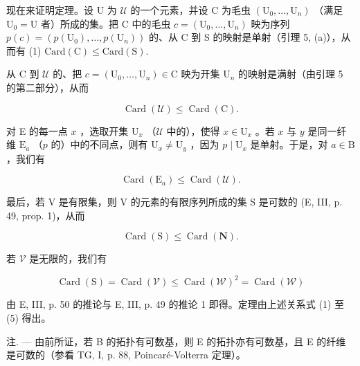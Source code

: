 现在来证明定理。设 U 为 \(\mathcal{U}\) 的一个元素，并设 C 为毛虫 \((\mathrm{U}_0,\dots ,\mathrm{U}_n)\) （满足 \(\mathrm{U}_0 = \mathrm{U}\) 者）所成的集。把 C 中的毛虫 \(c = (\mathrm{U}_0,\dots ,\mathrm{U}_n)\) 映为序列 \(p(c) = (p(\mathrm{U}_{0}), \ldots, p(\mathrm{U}_{n}))\) 的、从 C 到 S 的映射是单射（引理 5, (a)），从而有 (1) \(\text{Card}(\mathrm{C}) \leqslant \text{Card}(\mathrm{S}).\)

从 C 到 \(\mathcal{U}\) 的、把 \(c = (\mathrm{U}_0,\dots ,\mathrm{U}_n)\in \mathrm{C}\) 映为开集 \(\mathrm{U}_n\) 的映射是满射（由引理 5 的第二部分），从而

\[
\operatorname{Card} (\mathcal {U}) \leqslant \operatorname{Card} (\mathrm{C}).\tag{2}
\]

对 E 的每一点 \(x\) ，选取开集 \(\mathrm{U}_x\) （\(\mathcal{U}\) 中的），使得 \(x \in \mathrm{U}_x\) 。若 \(x\) 与 \(y\) 是同一纤维 \(\mathrm{E}_a\) （\(p\) 的）中的不同点，则有 \(\mathrm{U}_x \neq \mathrm{U}_y\) ，因为 \(p \mid \mathrm{U}_x\) 是单射。于是，对 \(a \in \mathrm{B}\) ，我们有

\[
\operatorname{Card} \left(\mathrm{E} _ {a}\right) \leqslant \operatorname{Card} (\mathcal {U}).\tag{3}
\]

最后，若 V 是有限集，则 V 的元素的有限序列所成的集 S 是可数的 (E, III, p. 49, prop. 1)，从而

\[
\operatorname{Card} (\mathrm{S}) \leqslant \operatorname{Card} (\mathbf {N}).\tag{4}
\]

若 \(\mathcal{V}\) 是无限的，我们有

\[
\operatorname{Card} (\mathrm{S}) = \operatorname{Card} (\mathcal {V}) \leqslant \operatorname{Card} (\mathcal {W}) ^ {2} = \operatorname{Card} (\mathcal {W})\tag{5}
\]

由 E, III, p. 50 的推论与 E, III, p. 49 的推论 1 即得。定理由上述关系式 (1) 至 (5) 得出。

注. --- 由前所证，若 B 的拓扑有可数基，则 E 的拓扑亦有可数基，且 E 的纤维是可数的（参看 TG, I, p. 88, Poincaré-Volterra 定理）。

